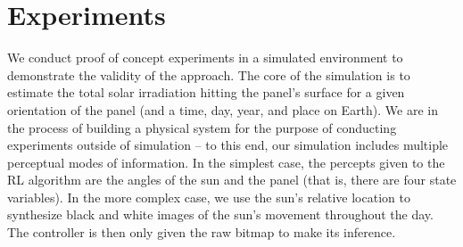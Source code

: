 \documentclass[11pt]{article}
\begin{document}
\section{Experiments}

We conduct proof of concept experiments in a simulated environment to demonstrate the validity of the approach. The core of the simulation is to estimate the total solar irradiation hitting the panel's surface for a given orientation of the panel (and a time, day, year, and place on Earth). We are in the process of building a physical system for the purpose of conducting experiments outside of simulation -- to this end, our simulation includes multiple perceptual modes of information. In the simplest case, the percepts given to the RL algorithm are the angles of the sun and the panel (that is, there are four state variables). In the more complex case, we use the sun's relative location to synthesize black and white images of the sun's movement throughout the day. The controller is then only given the raw bitmap to make its inference. %
\end{document}
